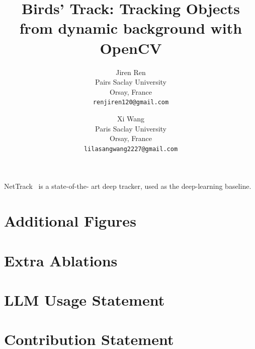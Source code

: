\documentclass[10pt,twocolumn,letterpaper]{article}
\title{Birds' Track: Tracking Objects from dynamic background with OpenCV}
\author{Jiren Ren\\
Pairs Saclay University\\
Orsay, France\\
{\tt\small renjiren120@gmail.com}
\and
Xi Wang\\
Paris Saclay University\\
Orsay, France\\
{\tt\small lilasangwang2227@gmail.com}
}
\begin{document}
\maketitle
    







NetTrack~\cite{zheng2024nettrack} is a state-of-the-
art deep tracker, used as the deep-learning baseline.

\clearpage
\appendix

\renewcommand{\bibsection}{\section{References}}
{
    \small
    
    
}

\clearpage
\section{Additional Figures}

\clearpage

\section{Extra Ablations}


\section{LLM Usage Statement}


\section{Contribution Statement}



% 
\end{document}
